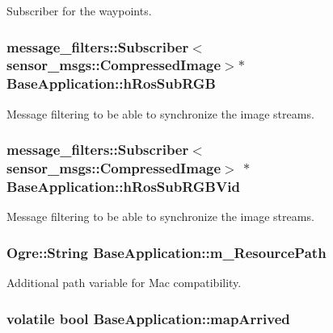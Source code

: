 \-Subscriber for the waypoints. \hypertarget{classBaseApplication_a6ca1659d73ae918a940dcf0e360f1628}{
\subsubsection[{h\-Ros\-Sub\-R\-G\-B}]{\setlength{\rightskip}{0pt plus 5cm}message\-\_\-filters\-::\-Subscriber$<$sensor\-\_\-msgs\-::\-Compressed\-Image$>$$\ast$ {\bf \-Base\-Application\-::h\-Ros\-Sub\-R\-G\-B}}}\label{classBaseApplication_a6ca1659d73ae918a940dcf0e360f1628}
\-Message filtering to be able to synchronize the image streams. \hypertarget{classBaseApplication_af475693cdd420f8f8e18269f242fc0af}{
\subsubsection[{h\-Ros\-Sub\-R\-G\-B\-Vid}]{\setlength{\rightskip}{0pt plus 5cm}message\-\_\-filters\-::\-Subscriber$<$sensor\-\_\-msgs\-::\-Compressed\-Image$>$ $\ast$ {\bf \-Base\-Application\-::h\-Ros\-Sub\-R\-G\-B\-Vid}}}\label{classBaseApplication_af475693cdd420f8f8e18269f242fc0af}
\-Message filtering to be able to synchronize the image streams. \hypertarget{classBaseApplication_ad96aabaabb2aeaf7bbb88e995b82eb02}{
\subsubsection[{m\-\_\-\-Resource\-Path}]{\setlength{\rightskip}{0pt plus 5cm}\-Ogre\-::\-String {\bf \-Base\-Application\-::m\-\_\-\-Resource\-Path}}}\label{classBaseApplication_ad96aabaabb2aeaf7bbb88e995b82eb02}
\-Additional path variable for \-Mac compatibility. \hypertarget{classBaseApplication_a5129489840c94ca7bcc092ebe5bea689}{
\subsubsection[{map\-Arrived}]{\setlength{\rightskip}{0pt plus 5cm}volatile bool {\bf \-Base\-Application\-::map\-Arrived}}}\label{classBaseApplication_a5129489840c94ca7bcc092ebe5bea689}
